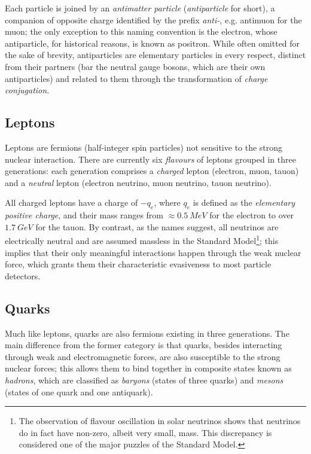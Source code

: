 Each particle is joined by an \textit{antimatter particle} (\textit{antiparticle} for short), a companion of opposite charge identified by the prefix \textit{anti-}, e.g. antimuon for the muon; the only exception to this naming convention is the electron, whose antiparticle, for historical reasons, is known as positron.
While often omitted for the sake of brevity, antiparticles are elementary particles in every respect, distinct from their partners (bar the neutral gauge bosons, which are their own antiparticles) and related to them through the transformation of \textit{charge conjugation}.

\subsection{Leptons}
Leptons are fermions (half-integer spin particles) not sensitive to the strong nuclear interaction.
There are currently six \textit{flavours} of leptons grouped in three generations: each generation comprises a \textit{charged} lepton (electron, muon, tauon) and a \textit{neutral} lepton (electron neutrino, muon neutrino, tauon neutrino).

All charged leptons have a charge of $-q_e$, where $q_e$ is defined as the \textit{elementary positive charge}, and their mass ranges from $\approx \SI{0.5}{MeV}$ for the electron to over $\SI{1.7}{GeV}$ for the tauon.
By contrast, as the names suggest, all neutrinos are electrically neutral and are assumed massless in the Standard Model\footnote{The observation of flavour oscillation in solar neutrinos shows that neutrinos do in fact have non-zero, albeit very small, mass. This discrepancy is considered one of the major puzzles of the Standard Model.}; this implies that their only meaningful interactions happen through the weak nuclear force, which grants them their characteristic evasiveness to most particle detectors.


\subsection{Quarks}
Much like leptons, quarks are also fermions existing in three generations. The main difference from the former category is that quarks, besides interacting through weak and electromagnetic forces, are also susceptible to the strong nuclear forces; this allows them to bind together in composite states known as \textit{hadrons}, which are classified as \textit{baryons} (states of three quarks) and \textit{mesons} (states of one quark and one antiquark).


